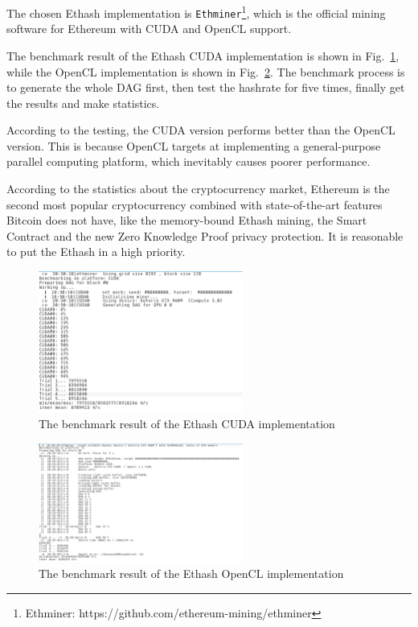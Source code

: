 \documentclass[11pt]{article}
\begin{document}
The chosen Ethash implementation is \texttt{Ethminer}\footnote{Ethminer: https://github.com/ethereum-mining/ethminer}, which is the official mining software for Ethereum with CUDA and OpenCL support. 

The benchmark result of the Ethash CUDA implementation is shown in Fig.~\ref{fig:ethash_cuda_test}, while the OpenCL implementation is shown in Fig.~\ref{fig:ethash_opencl_test}. The benchmark process is to generate the whole DAG first, then test the hashrate for five times, finally get the results and make statistics.

According to the testing, the CUDA version performs better than the OpenCL version. This is because OpenCL targets at implementing a general-purpose parallel computing platform, which inevitably causes poorer performance.

According to the statistics about the cryptocurrency market, Ethereum is the second most popular cryptocurrency combined with state-of-the-art features Bitcoin does not have, like the memory-bound Ethash mining, the Smart Contract and the new Zero Knowledge Proof privacy protection. It is reasonable to put the Ethash in a high priority.

\begin{figure}[h]
    \centering
    \includegraphics[width=0.6\textwidth]{ethash_cuda_test.eps}
    \caption{The benchmark result of the Ethash CUDA implementation}
    \label{fig:ethash_cuda_test}
\end{figure}

\begin{figure}[h]
    \centering
    \includegraphics[width=0.6\textwidth]{ethash_opencl_test.eps}
    \caption{The benchmark result of the Ethash OpenCL implementation}
    \label{fig:ethash_opencl_test}
\end{figure}
\end{document}
